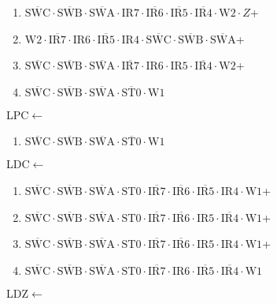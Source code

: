 \documentclass[UTF8]{ctexart}
\begin{document}
\begin{enumerate}[\indent\indent]
	\item $\overline{\text{SWC}} \cdot\overline{\text{SWB}}\cdot \overline{\text{SWA}} \cdot \text{IR7} \cdot \overline{\text{IR6}} \cdot \overline{\text{IR5}} \cdot \overline{\text{IR4}} \cdot \text{W2} \cdot Z$+
	\item $\text{W2} \cdot \overline{\text{IR7}} \cdot \text{IR6} \cdot \overline{\text{IR5}} \cdot \text{IR4} \cdot \overline{\text{SWC}} \cdot\overline{\text{SWB}}\cdot \overline{\text{SWA}}$+
	\item $\overline{\text{SWC}} \cdot\overline{\text{SWB}}\cdot \overline{\text{SWA}} \cdot \overline{\text{IR7}} \cdot \text{IR6} \cdot \text{IR5} \cdot \overline{\text{IR4}} \cdot \text{W2}$+
	\item $\overline{\text{SWC}}\cdot\overline{\text{SWB}}\cdot\overline{\text{SWA}}\cdot\overline{\text{ST0}}\cdot\text{W1}$
\end{enumerate}
LPC$\leftarrow$
\begin{enumerate}[\indent\indent]
	\item$\overline{\text{SWC}}\cdot\overline{\text{SWB}}\cdot\overline{\text{SWA}}\cdot\overline{\text{ST0}}\cdot\text{W1}$
\end{enumerate}
LDC$\leftarrow$
\begin{enumerate}[\indent\indent]
	\item$\overline{\text{SWC}}\cdot\overline{\text{SWB}}\cdot\overline{\text{SWA}}\cdot\text{ST0}\cdot\overline{\text{IR7}}\cdot\overline{\text{IR6}}\cdot\overline{\text{IR5}}\cdot\text{IR4}\cdot\text{W1}$+
	\item$\overline{\text{SWC}}\cdot\overline{\text{SWB}}\cdot\overline{\text{SWA}}\cdot\text{ST0}\cdot\overline{\text{IR7}}\cdot\overline{\text{IR6}}\cdot{\text{IR5}}\cdot\overline{\text{IR4}}\cdot\text{W1}$+
	\item$\overline{\text{SWC}}\cdot\overline{\text{SWB}}\cdot\overline{\text{SWA}}\cdot\text{ST0}\cdot\overline{\text{IR7}}\cdot\overline{\text{IR6}}\cdot\text{IR5}\cdot\text{IR4}\cdot\text{W1}$+
	\item$\overline{\text{SWC}}\cdot\overline{\text{SWB}}\cdot\overline{\text{SWA}}\cdot\text{ST0}\cdot\overline{\text{IR7}}\cdot{\text{IR6}}\cdot\overline{\text{IR5}}\cdot\overline{\text{IR4}}\cdot\text{W1}$
\end{enumerate}
LDZ$\leftarrow$
\end{document}
